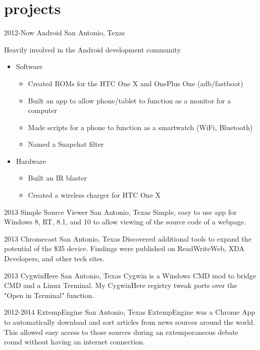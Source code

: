 \documentclass[]{friggeri-cv} %
\begin{document}

\section{projects}

\begin{entrylist}


\entry
{2012-Now}
{Android}
{San Antonio, Texas}
{Heavily involved in the Android development community 
\begin{itemize}
	\item Software
	\begin{itemize} 
		\item Created ROMs for the HTC One X and OnePlus One (adb/fastboot)  
		\item Built an app to allow phone/tablet to function as a  monitor for a computer
		\item Made scripts for a phone to function as a smartwatch (WiFi, Bluetooth)
		\item Named a Snapchat filter 
	\end{itemize} 
	\item Hardware 
	\begin{itemize}
		\item Built an IR blaster 
		\item Created a wireless charger for HTC One X 
	\end{itemize}
\end{itemize}
}


\entry
{2013}
{Simple Source Viewer}
{San Antonio, Texas}
{Simple, easy to use app for Windows 8, RT, 8.1, and 10 to allow viewing of the source code of a webpage.}


\entry
{2013}
{Chromecast}
{San Antonio, Texas}
{Discovered additional tools to expand the potential of the \$35 device. Findings were published on ReadWriteWeb, XDA Developers, and other tech sites.}


\entry
{2013}
{CygwinHere}
{San Antonio, Texas}
{Cygwin is a Windows CMD mod to bridge CMD and a Linux Terminal. My CygwinHere registry tweak ports over the "Open in Terminal" function.}


\entry
{2012-2014}
{ExtempEngine}
{San Antonio, Texas}
{ExtempEngine was a Chrome App to automatically download and sort articles from news sources around the world. This allowed easy access to those sources during an extemporaneous debate round without having an internet connection.}


\end{entrylist}
\end{document}
